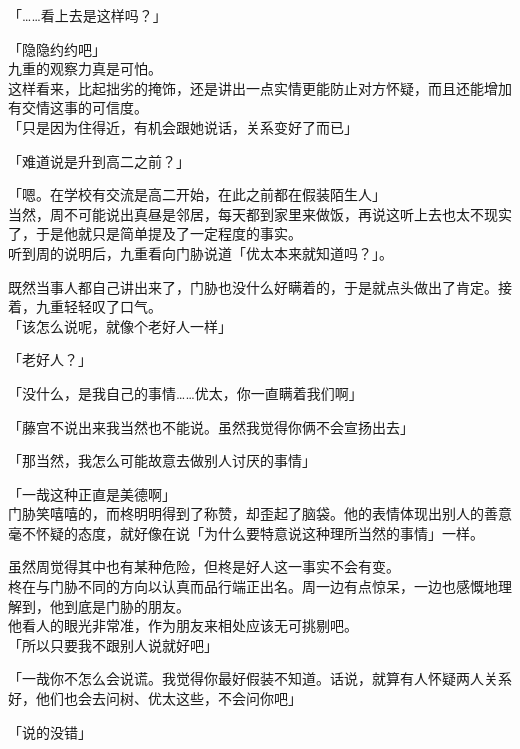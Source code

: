「……看上去是这样吗？」

「隐隐约约吧」\\

九重的观察力真是可怕。\\

这样看来，比起拙劣的掩饰，还是讲出一点实情更能防止对方怀疑，而且还能增加有交情这事的可信度。\\

「只是因为住得近，有机会跟她说话，关系变好了而已」

「难道说是升到高二之前？」

「嗯。在学校有交流是高二开始，在此之前都在假装陌生人」\\

当然，周不可能说出真昼是邻居，每天都到家里来做饭，再说这听上去也太不现实了，于是他就只是简单提及了一定程度的事实。\\

听到周的说明后，九重看向门胁说道「优太本来就知道吗？」。

既然当事人都自己讲出来了，门胁也没什么好瞒着的，于是就点头做出了肯定。接着，九重轻轻叹了口气。\\

「该怎么说呢，就像个老好人一样」

「老好人？」

「没什么，是我自己的事情……优太，你一直瞒着我们啊」

「藤宫不说出来我当然也不能说。虽然我觉得你俩不会宣扬出去」

「那当然，我怎么可能故意去做别人讨厌的事情」

「一哉这种正直是美德啊」\\

门胁笑嘻嘻的，而柊明明得到了称赞，却歪起了脑袋。他的表情体现出别人的善意毫不怀疑的态度，就好像在说「为什么要特意说这种理所当然的事情」一样。

虽然周觉得其中也有某种危险，但柊是好人这一事实不会有变。\\

柊在与门胁不同的方向以认真而品行端正出名。周一边有点惊呆，一边也感慨地理解到，他到底是门胁的朋友。\\

他看人的眼光非常准，作为朋友来相处应该无可挑剔吧。\\

「所以只要我不跟别人说就好吧」

「一哉你不怎么会说谎。我觉得你最好假装不知道。话说，就算有人怀疑两人关系好，他们也会去问树、优太这些，不会问你吧」

「说的没错」\\

